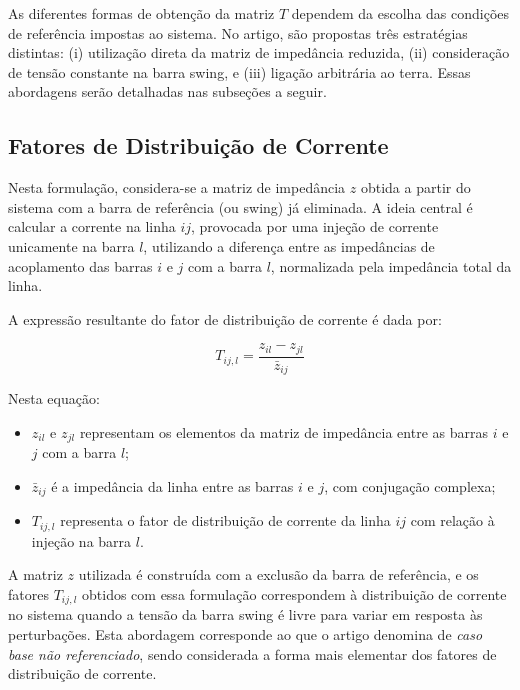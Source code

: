 \documentclass[journal]{IEEEtran}
\begin{document}
As diferentes formas de obtenção da matriz \( T \) dependem da escolha das condições de referência impostas ao sistema. No artigo, são propostas três estratégias distintas: (i) utilização direta da matriz de impedância reduzida, (ii) consideração de tensão constante na barra swing, e (iii) ligação arbitrária ao terra. Essas abordagens serão detalhadas nas subseções a seguir.

\subsection{Fatores de Distribuição de Corrente}

Nesta formulação, considera-se a matriz de impedância \( z \) obtida a partir do sistema com a barra de referência (ou swing) já eliminada. A ideia central é calcular a corrente na linha \( ij \), provocada por uma injeção de corrente unicamente na barra \( l \), utilizando a diferença entre as impedâncias de acoplamento das barras \( i \) e \( j \) com a barra \( l \), normalizada pela impedância total da linha.

A expressão resultante do fator de distribuição de corrente é dada por:

\begin{equation}
T_{ij,l} = \frac{z_{il} - z_{jl}}{\bar{z}_{ij}}
\label{eq:fdc}
\end{equation}

Nesta equação:
\begin{itemize}
  \item \( z_{il} \) e \( z_{jl} \) representam os elementos da matriz de impedância entre as barras \( i \) e \( j \) com a barra \( l \);
  \item \( \bar{z}_{ij} \) é a impedância da linha entre as barras \( i \) e \( j \), com conjugação complexa;
  \item \( T_{ij,l} \) representa o fator de distribuição de corrente da linha \( ij \) com relação à injeção na barra \( l \).
\end{itemize}

A matriz \( z \) utilizada é construída com a exclusão da barra de referência, e os fatores \( T_{ij,l} \) obtidos com essa formulação correspondem à distribuição de corrente no sistema quando a tensão da barra swing é livre para variar em resposta às perturbações. Esta abordagem corresponde ao que o artigo denomina de \textit{caso base não referenciado}, sendo considerada a forma mais elementar dos fatores de distribuição de corrente.
\end{document}
